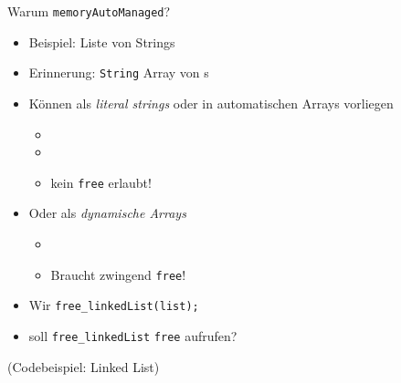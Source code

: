 
\begin{frame}[fragile]{Warum \texttt{memoryAutoManaged}?}
%
\begin{itemize}
\item Beispiel: Liste von Strings
\item Erinnerung: \texttt{String} \thus Array von s
\item Können als \emph{literal strings} oder in automatischen Arrays vorliegen 
	\begin{itemize}
	\item {}
	\item {}
	\item[\Thus] kein \texttt{free} erlaubt!
	\end{itemize}
\item Oder als \emph{dynamische Arrays}
	\begin{itemize}
	\item {}
	\item[\Thus] Braucht zwingend \texttt{free}!
	\end{itemize}
\item Wir \texttt{free\_linkedList(list);}
\item[\Thus] soll \texttt{free\_linkedList} \texttt{free} aufrufen?
\end{itemize}
%
\end{frame}


\begin{frame}
%
\begin{center}
(Codebeispiel: Linked List)
\end{center}
%
\end{frame}


